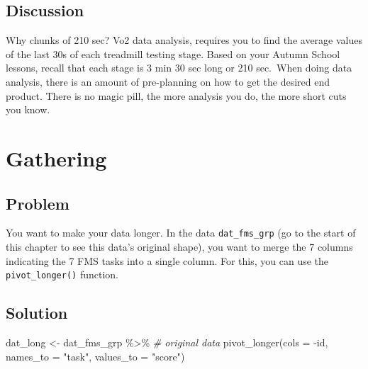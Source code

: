 \documentclass[
]{book}
\newenvironment{Shaded}{\begin{snugshade}}{\end{snugshade}}
\newcommand{\AttributeTok}[1]{\textcolor[rgb]{0.77,0.63,0.00}{#1}}
\newcommand{\CommentTok}[1]{\textcolor[rgb]{0.56,0.35,0.01}{\textit{#1}}}
\newcommand{\FunctionTok}[1]{\textcolor[rgb]{0.00,0.00,0.00}{#1}}
\newcommand{\NormalTok}[1]{#1}
\newcommand{\OtherTok}[1]{\textcolor[rgb]{0.56,0.35,0.01}{#1}}
\newcommand{\SpecialCharTok}[1]{\textcolor[rgb]{0.00,0.00,0.00}{#1}}
\newcommand{\StringTok}[1]{\textcolor[rgb]{0.31,0.60,0.02}{#1}}
\begin{document}
\hypertarget{discussion-1}{%
\subsection{Discussion}\label{discussion-1}}

Why chunks of 210 sec? Vo2 data analysis, requires you to find the average values of the last 30s of each treadmill testing stage. Based on your Autumn School lessons, recall that each stage is 3 min 30 sec long or 210 sec.~When doing data analysis, there is an amount of pre-planning on how to get the desired end product. There is no magic pill, the more analysis you do, the more short cuts you know.

\hypertarget{WRANGLE-GATHER}{%
\section{Gathering}\label{WRANGLE-GATHER}}

\hypertarget{problem-5}{%
\subsection{Problem}\label{problem-5}}

You want to make your data longer. In the data \texttt{dat\_fms\_grp} (go to the start of this chapter to see this data's original shape), you want to merge the 7 columns indicating the 7 FMS tasks into a single column. For this, you can use the \texttt{pivot\_longer()} function.

\hypertarget{solution-5}{%
\subsection{Solution}\label{solution-5}}

\begin{Shaded}
\begin{Highlighting}[]
\NormalTok{dat\_long }\OtherTok{\textless{}{-}}\NormalTok{ dat\_fms\_grp }\SpecialCharTok{\%\textgreater{}\%} \CommentTok{\# original data}
  \FunctionTok{pivot\_longer}\NormalTok{(}\AttributeTok{cols =} \SpecialCharTok{{-}}\NormalTok{id,}
              \AttributeTok{names\_to =} \StringTok{"task"}\NormalTok{,}
              \AttributeTok{values\_to =} \StringTok{"score"}\NormalTok{)}
\end{Highlighting}
\end{Shaded}
\end{document}
